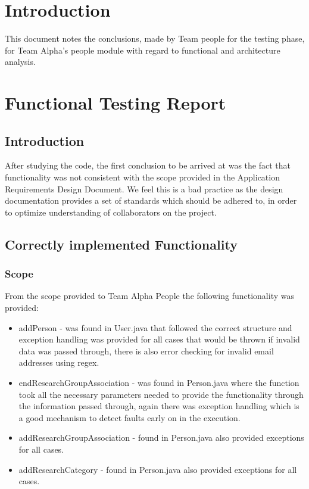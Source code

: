 \documentclass{article}
\begin{document}
 
\tableofcontents
\thispagestyle{empty}
\cleardoublepage


\setcounter{page}{1}
\section{Introduction}
This document notes the conclusions, made by Team people for the testing phase, for Team Alpha's people module with regard to functional and architecture analysis. \\

\newpage

\section{Functional Testing Report}
	\subsection{Introduction}
	After studying the code, the first conclusion to be arrived at was the fact that functionality was not consistent with the scope provided in the Application Requirements Design Document. We feel this is a bad practice as the design documentation provides a set of standards which should be adhered to, in order to optimize understanding of collaborators on the project.\\

	\subsection{Correctly implemented Functionality}
	\subsubsection{Scope}
	From the scope provided to Team Alpha People the following functionality was provided:
	\begin{itemize}
		\item addPerson - was found in User.java that followed the correct structure and exception handling was provided for all cases that would be thrown if invalid data was passed through, there is also error checking for invalid email addresses using regex.
		\item endResearchGroupAssociation - was found in Person.java where the function took all the necessary parameters needed to provide the functionality through the information passed through, again there was exception handling which is a good mechanism to detect faults early on in the execution.
		\item addResearchGroupAssociation - found in Person.java also provided exceptions for all cases.
		\item addResearchCategory - found in Person.java also provided exceptions for all cases.
		
	\end{itemize}
	
\end{document}
